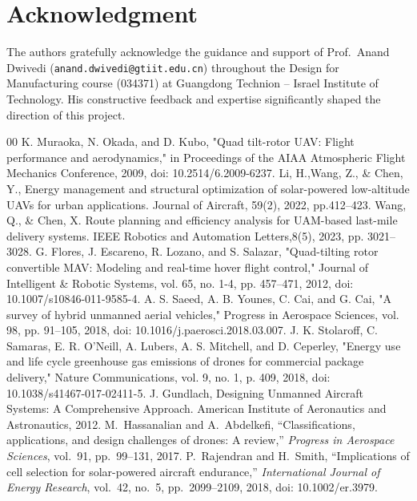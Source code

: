 \documentclass[conference]{IEEEtran}
\begin{document}
\section*{Acknowledgment}

The authors gratefully acknowledge the guidance and support of Prof.\ Anand Dwivedi (\texttt{anand.dwivedi@gtiit.edu.cn}) throughout the Design for Manufacturing course (034371) at Guangdong Technion -- Israel Institute of Technology. His constructive feedback and expertise significantly shaped the direction of this project.


\begin{thebibliography}{00}
 K. Muraoka, N. Okada, and D. Kubo, "Quad tilt-rotor UAV: Flight performance and aerodynamics," in Proceedings of the AIAA Atmospheric Flight Mechanics Conference, 2009, doi: 10.2514/6.2009-6237.
 Li, H.,Wang, Z., \& Chen, Y., Energy management and structural optimization of solar-powered low-altitude UAVs for urban applications. Journal of Aircraft, 59(2), 2022, pp.412--423.
 Wang, Q., \& Chen, X. Route planning and efficiency analysis for UAM-based last-mile delivery systems. IEEE Robotics and Automation Letters,8(5), 2023, pp. 3021--3028.
 G. Flores, J. Escareno, R. Lozano, and S. Salazar, "Quad-tilting rotor convertible MAV: Modeling and real-time hover flight control," Journal of Intelligent \& Robotic Systems, vol. 65, no. 1-4, pp. 457–471, 2012, doi: 10.1007/s10846-011-9585-4.
 A. S. Saeed, A. B. Younes, C. Cai, and G. Cai, "A survey of hybrid unmanned aerial vehicles," Progress in Aerospace Sciences, vol. 98, pp. 91–105, 2018, doi: 10.1016/j.paerosci.2018.03.007.
 J. K. Stolaroff, C. Samaras, E. R. O'Neill, A. Lubers, A. S. Mitchell, and D. Ceperley, "Energy use and life cycle greenhouse gas emissions of drones for commercial package delivery," Nature Communications, vol. 9, no. 1, p. 409, 2018, doi: 10.1038/s41467-017-02411-5.
 J. Gundlach, Designing Unmanned Aircraft Systems: A Comprehensive Approach. American Institute of Aeronautics and Astronautics, 2012.
M.~Hassanalian and A.~Abdelkefi,
``Classifications, applications, and design challenges of drones: A review,''
\textit{Progress in Aerospace Sciences},
vol.~91, pp.~99--131, 2017.
P.~Rajendran and H.~Smith,
``Implications of cell selection for solar-powered aircraft endurance,''
\textit{International Journal of Energy Research},
vol.~42, no.~5, pp.~2099--2109, 2018, doi: 10.1002/er.3979.
\end{thebibliography}
\vspace{12pt}
\end{document}
